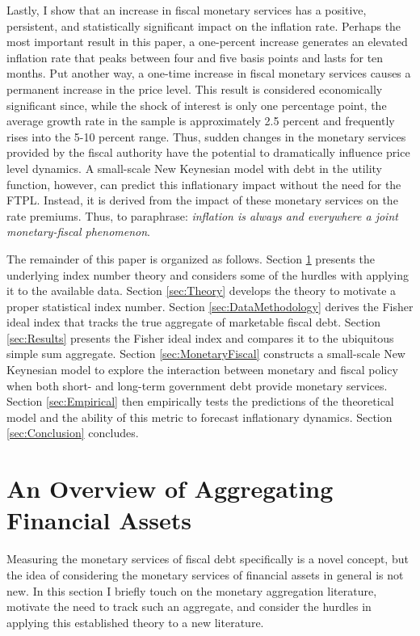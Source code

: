 \documentclass[11pt,a4paper,margin=1.5in]{article}
\begin{document}
Lastly, I show that an increase in fiscal monetary services has a positive, persistent, and statistically significant impact on the inflation rate.
Perhaps the most important result in this paper, a one-percent increase generates an elevated inflation rate that peaks between four and five basis points and lasts for ten months. 
Put another way, a one-time increase in fiscal monetary services causes a permanent increase in the price level. 
This result is considered economically significant since, while the shock of interest is only one percentage point, the average growth rate in the sample is approximately 2.5 percent and frequently rises into the 5-10 percent range.
Thus, sudden changes in the monetary services provided by the fiscal authority have the potential to dramatically influence price level dynamics.
A small-scale New Keynesian model with debt in the utility function, however, can predict this inflationary impact without the need for the FTPL. 
Instead, it is derived from the impact of these monetary services on the rate premiums. 
Thus, to paraphrase: {\em inflation is always and everywhere a joint monetary-fiscal phenomenon}.


The remainder of this paper is organized as follows.
Section \ref{sec:MonAgg} presents the underlying index number theory and considers some of the hurdles with applying it to the available data.
Section \ref{sec:Theory} develops the theory to motivate a proper statistical index number.
Section \ref{sec:DataMethodology} derives the Fisher ideal index that tracks the true aggregate of marketable fiscal debt.
Section \ref{sec:Results} presents the Fisher ideal index and compares it to the ubiquitous simple sum aggregate.
Section \ref{sec:MonetaryFiscal} constructs a small-scale New Keynesian model to explore the interaction between monetary and fiscal policy when both short- and long-term government debt provide monetary services.
Section \ref{sec:Empirical} then empirically tests the predictions of the theoretical model and the ability of this metric to forecast inflationary dynamics.
Section \ref{sec:Conclusion} concludes.


\section{An Overview of Aggregating Financial Assets}
\label{sec:MonAgg}
Measuring the monetary services of fiscal debt specifically is a novel concept, but the idea of considering the monetary services of financial assets in general is not new.
In this section I briefly touch on the monetary aggregation literature, motivate the need to track such an aggregate, and consider the hurdles in applying this established theory to a new literature. 
\end{document}
